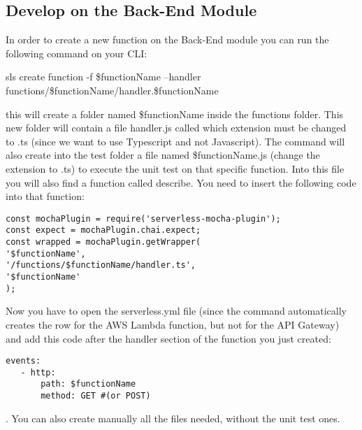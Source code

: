 \subsection{Develop on the Back-End Module}
In order to create a new function on the Back-End module you can run the following command on your CLI: 
\begin{center}
sls create function -f \$functionName --handler functions/\$functionName/handler.\$functionName
\end{center}
this will create a folder named \$functionName inside the functions folder. This new folder will contain a file handler.js called which extension must be changed to .ts (since we want to use Typescript and not Javascript). 
The command will also create into the test folder a file named \$functionName.js (change the extension to .ts) to execute the unit test on that specific function.
Into this file you will also find a function called describe. You need to insert the following code into that function:
\begin{lstlisting}
const mochaPlugin = require('serverless-mocha-plugin');
const expect = mochaPlugin.chai.expect;
const wrapped = mochaPlugin.getWrapper(
'$functionName', 
'/functions/$functionName/handler.ts',
'$functionName'
);
\end{lstlisting}
Now you have to open the serverless.yml file (since the command automatically creates the row for the AWS Lambda function, but not for the API Gateway) and add this code after the handler section of the function you just created:
\begin{lstlisting}
events:
   - http:
       path: $functionName
       method: GET #(or POST)
\end{lstlisting}.
You can also create manually all the files needed, without the unit test ones.